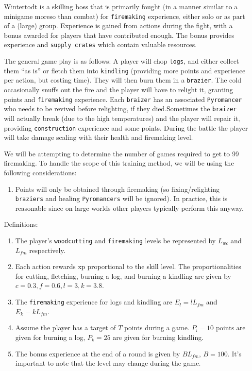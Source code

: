 Wintertodt is a skilling boss that is primarily fought (in a manner similar to a minigame moreso than combat) for \texttt{firemaking} experience, either solo or as part of a (large) group. Experience is gained from actions during the fight, with a bonus awarded for players that have contributed enough. The bonus provides experience and \texttt{supply crates} which contain valuable resources.

The general game play is as follows: A player will chop \texttt{logs}, and either collect them ``as is'' or fletch them into \texttt{kindling} (providing more points and experience per action, but costing time). They will then burn them in a \texttt{brazier}. The cold occasionally snuffs out the fire and the player will have to relight it, granting points and \texttt{firemaking} experience. Each \texttt{braizer} has an associated \texttt{Pyromancer} who needs to be revived before relighting, if they died.Sometimes the \texttt{braizer} will actually break (due to the high temperatures) and the player will repair it, providing \texttt{construction} experience and some points. During the battle the player will take damage scaling with their health and firemaking level.

We will be attempting to determine the number of games required to get to 99 firemaking. To handle the scope of this training method, we will be using the following considerations:
\begin{enumerate}
	\item Points will only be obtained through firemaking (so fixing/relighting \texttt{braziers} and healing \texttt{Pyromancers} will be ignored). In practice, this is reasonable since on large worlds other players typically perform this anyway.
\end{enumerate}

Definitions:
\begin{enumerate}
	\item The player's \texttt{woodcutting} and \texttt{firemaking} levels be represented by $L_{wc}$ and $L_{fm}$ respectively.
	\item Each action rewards xp proportional to the skill level. The proportionalities for cutting, fletching, burning a log, and burning a kindling are given by $c=0.3, f=0.6, l=3, k=3.8$.
	\item The \texttt{firemaking} experience for logs and kindling are $E_l=l L_{fm}$ and $E_k = kL_{fm}$.
	\item Assume the player has a target of $T$ points during a game. $P_l=10$ points are given for burning a log, $P_k=25$ are given for burning kindling.
	\item The bonus experience at the end of a round is given by $BL_{fm}$, $B=100$. It's important to note that the level may change during the game.
\end{enumerate}

